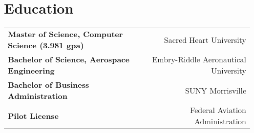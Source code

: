 \section*{Education}
\noindent
\begin{tabularx}{\textwidth}{@{}Xr@{}}
    \textbf{Master of Science, Computer Science \small{(3.981 gpa)}} & Sacred Heart University \\
    \textbf{Bachelor of Science, Aerospace Engineering} & Embry-Riddle Aeronautical University \\
    \textbf{Bachelor of Business Administration} & SUNY Morrisville \\
    \textbf{Pilot License} & Federal Aviation Administration \\
\end{tabularx}